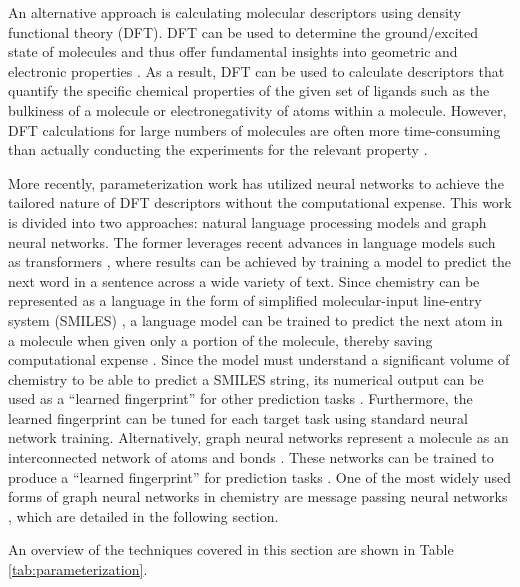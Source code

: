 An alternative approach is calculating molecular descriptors using density functional theory (DFT). DFT can be used to determine the ground/excited state of molecules and thus offer fundamental insights into geometric and electronic properties \cite{Shields2021}. As a result, DFT can be used to calculate descriptors that quantify the specific chemical properties of the given set of ligands such as the bulkiness of a molecule or electronegativity of atoms within a molecule. However, DFT calculations for large numbers of molecules are often more time-consuming than actually conducting the experiments for the relevant property \cite{Shields2021}.

More recently, parameterization work has utilized neural networks to achieve the tailored nature of DFT descriptors without the computational expense. This work is divided into two approaches: natural language processing models and graph neural networks. The former leverages recent advances in language models such as transformers \cite{Vaswani2017}, where results can be achieved by training a model to predict the next word in a sentence across a wide variety of text. Since chemistry can be represented as a language in the form of simplified molecular-input line-entry system (SMILES) \cite{Weininger1988}, a language model can be trained to predict the next atom in a molecule when given only a portion of the molecule, thereby saving computational expense \cite{Schwaller2019}. Since the model must understand a significant volume of chemistry to be able to predict a SMILES string, its numerical output can be used as a “learned fingerprint” for other prediction tasks \cite{Schwaller2021, Pomberger2023}. Furthermore, the learned fingerprint can be tuned for each target task using standard neural network training. Alternatively, graph neural networks represent a molecule as an interconnected network of atoms and bonds \cite{Kearnes2016}. These networks can be trained to produce a “learned fingerprint” for prediction tasks \cite{Yang2019}. One of the most widely used forms of graph neural networks in chemistry are message passing neural networks \cite{Gilmer2017}, which are detailed in the following section.

An overview of the techniques covered in this section are shown in Table \ref{tab:parameterization}.

